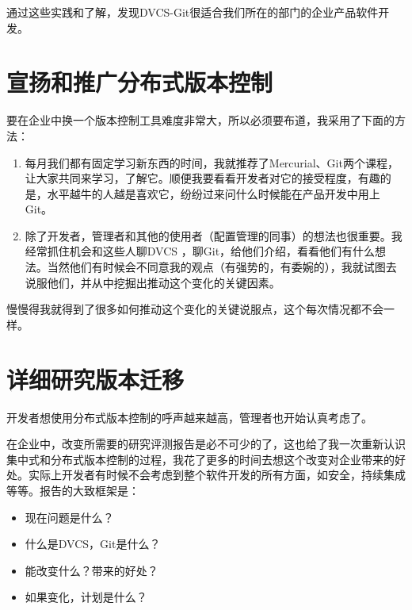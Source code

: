 通过这些实践和了解，发现DVCS-Git很适合我们所在的部门的企业产品软件开发。

\section{宣扬和推广分布式版本控制}
\label{宣扬和推广分布式版本控制}

要在企业中换一个版本控制工具难度非常大，所以必须要布道，我采用了下面的方法：

\begin{enumerate}
\item 每月我们都有固定学习新东西的时间，我就推荐了Mercurial、Git两个课程，让大家共同来学习，了解它。顺便我要看看开发者对它的接受程度，有趣的是，水平越牛的人越是喜欢它，纷纷过来问什么时候能在产品开发中用上Git。

\item 除了开发者，管理者和其他的使用者（配置管理的同事）的想法也很重要。我经常抓住机会和这些人聊DVCS ，聊Git，给他们介绍，看看他们有什么想法。当然他们有时候会不同意我的观点（有强势的，有委婉的），我就试图去说服他们，并从中挖掘出推动这个变化的关键因素。

\end{enumerate}

慢慢得我就得到了很多如何推动这个变化的关键说服点，这个每次情况都不会一样。

\section{详细研究版本迁移}
\label{详细研究版本迁移}

开发者想使用分布式版本控制的呼声越来越高，管理者也开始认真考虑了。

在企业中，改变所需要的研究评测报告是必不可少的了，这也给了我一次重新认识集中式和分布式版本控制的过程，我花了更多的时间去想这个改变对企业带来的好处。实际上开发者有时候不会考虑到整个软件开发的所有方面，如安全，持续集成等等。报告的大致框架是：

\begin{itemize}
\item 现在问题是什么？

\item 什么是DVCS，Git是什么？

\item 能改变什么？带来的好处？

\item 如果变化，计划是什么？

\end{itemize}

